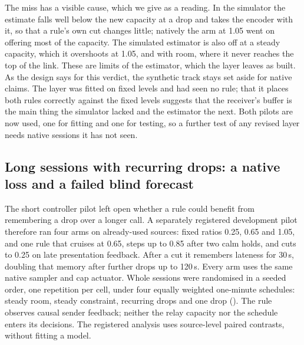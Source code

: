 The miss has a visible cause, which we give as a reading. In the simulator the estimate falls well below the new capacity at a drop and takes the encoder with it, so that a rule's own cut changes little; natively the arm at 1.05 went on offering most of the capacity. The simulated estimator is also off at a steady capacity, which it overshoots at 1.05, and with room, where it never reaches the top of the link. These are limits of the estimator, which the layer leaves as built. As the design says for this verdict, the synthetic track stays set aside for native claims. The layer was fitted on fixed levels and had seen no rule; that it places both rules correctly against the fixed levels suggests that the receiver's buffer is the main thing the simulator lacked and the estimator the next. Both pilots are now used, one for fitting and one for testing, so a further test of any revised layer needs native sessions it has not seen.
\fi



\ifdefined\MarginPilotSessions
\subsection{Long sessions with recurring drops: a native loss and a failed blind forecast}
\label{sec:native-margin}
The short controller pilot left open whether a rule could benefit from remembering a drop over a longer call. A separately registered development pilot therefore ran four arms on \MarginPilotSources{} already-used sources: fixed ratios 0.25, 0.65 and 1.05, and one rule that cruises at 0.65, steps up to 0.85 after two calm holds, and cuts to 0.25 on late presentation feedback. After a cut it remembers lateness for 30\,s, doubling that memory after further drops up to 120\,s. Every arm uses the same native sampler and cap actuator. Whole sessions were randomised in a seeded order, one repetition per cell, under four equally weighted one-minute schedules: steady room, steady constraint, recurring drops and one drop (). The rule observes causal sender feedback; neither the relay capacity nor the schedule enters its decisions. The registered analysis uses source-level paired contrasts, without fitting a model.

\begin{table}[t]
\centering\small

\caption{Completed \MarginPilotSessions{}-session development pilot. Endpoint: on-time sampled RGB-PSNR contribution per capture request, schedules weighted equally. Forecasts are synthetic, committed before capture; native outcomes are factual. Intervals are over twelve sources, not 192 independent sessions. The endpoint is not perceptual QoE.}\label{tab:margin-arms}
\end{table}

